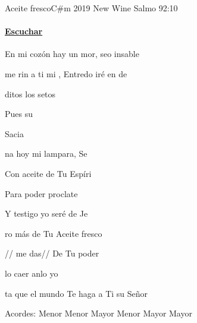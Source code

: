 \documentclass[12pt, spanish]{book}
\newcommand{\NotCCLIed}{\relax}
\begin{document}
    \begin{song}{Aceite fresco}{C\#m}
        {2019} %
        {New Wine}
        {Salmo 92:10} %
        {} %
        \ifChordBk
        \paragraph{\mbox{}\hfill\protect\href{https://open.spotify.com/intl-es/track/2jIBt8XiJE8EZmVQzkxqOU}{Escuchar}\mbox{}\hfill}
        \fi

        \begin{SBOpGroup}
            En mi cozón hay un mor, seo insable

            me rin a ti mi , Entredo iré en  de 


            ditos los setos

            Pues su 

            Sacia
        \end{SBOpGroup}

        \begin{SBChorus}
            na hoy mi lampara, Se

            Con aceite de Tu Espíri

            Para poder proclate

            Y testigo yo seré de Je
        \end{SBChorus}

        \begin{SBOpGroup}
            ro más de Tu Aceite fresco

            // me das// De Tu poder

            lo caer anlo yo

            ta que el mundo Te haga a Ti su Señor
        \end{SBOpGroup}

        \ifChordBk
        \begin{SBOpGroup}
            Acordes:\break
             Menor \hfill
             Menor \hfill\null\break
             Mayor \hfill
             Menor \hfill\null\break
             Mayor \hfill
             Mayor \hfill\null\break
        \end{SBOpGroup}
        \fi
    \end{song}
\end{document}
